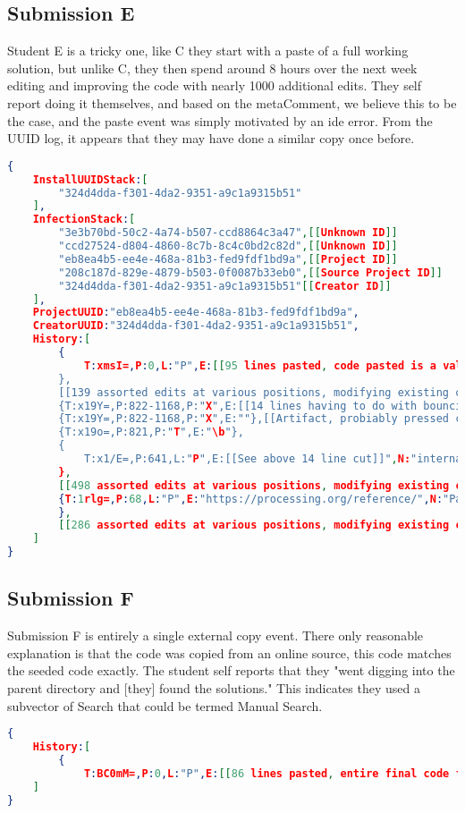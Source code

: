 \documentclass[12pt,final,thesis,actual]{uhthesis}
\newcommand{\metaComment}{metaComment\xspace}
\begin{document}
\subsection{Submission E}
Student E is a tricky one, like C they start with a paste of a full working solution, but unlike C, they then spend around 8 hours over the next week editing and improving the code with nearly 1000 additional edits.  They self report doing it themselves, and based on the \metaComment, we believe this to be the case, and the paste event was simply motivated by an ide error.  From the UUID log, it appears that they may have done a similar copy once before.\pagebreak
\begin{lstlisting}[language=json]
{
	InstallUUIDStack:[
		"324d4dda-f301-4da2-9351-a9c1a9315b51"
	],
	InfectionStack:[
		"3e3b70bd-50c2-4a74-b507-ccd8864c3a47",[[Unknown ID]]
		"ccd27524-d804-4860-8c7b-8c4c0bd2c82d",[[Unknown ID]]
		"eb8ea4b5-ee4e-468a-81b3-fed9fdf1bd9a",[[Project ID]]
		"208c187d-829e-4879-b503-0f0087b33eb0",[[Source Project ID]]
		"324d4dda-f301-4da2-9351-a9c1a9315b51"[[Creator ID]]
	],
	ProjectUUID:"eb8ea4b5-ee4e-468a-81b3-fed9fdf1bd9a",
	CreatorUUID:"324d4dda-f301-4da2-9351-a9c1a9315b51",
	History:[
		{
			T:xmsI=,P:0,L:"P",E:[[95 lines pasted, code pasted is a valid solution, but not the final]]}",N:"paste from project with same creator;Paste from project with UUID 208c187d-829e-4879-b503-0f0087b33eb0;"
		},
		[[139 assorted edits at various positions, modifying existing code, and adding new code/comments, no copies or pastes]]
		{T:x19Y=,P:822-1168,P:"X",E:[[14 lines having to do with bouncing]]},
		{T:x19Y=,P:822-1168,P:"X",E:""},[[Artifact, probiably pressed ctrl X twice]]
		{T:x19o=,P:821,P:"T",E:"\b"},
		{
			T:x1/E=,P:641,L:"P",E:[[See above 14 line cut]]",N:"internal paste;"
		},
		[[498 assorted edits at various positions, modifying existing code, and adding new code/comments including many short interal copy paste]]
		{T:1rlg=,P:68,L:"P",E:"https://processing.org/reference/",N:"Paste from noncoded source"[[copied URL from browser in comment]]
		},
		[[286 assorted edits at various positions, modifying existing code, and adding new code/comments including many short interal copy paste]]
	]
}
\end{lstlisting}
\subsection{Submission F}
Submission F is entirely a single external copy event.  There only reasonable explanation is that the code was copied from an online source, this code matches the seeded code exactly.  The student self reports that they "went digging into the parent directory and [they] found the solutions."  This indicates they used a subvector of Search that could be termed Manual Search.
\begin{lstlisting}[language=json]
{
	History:[
		{
			T:BC0mM=,P:0,L:"P",E:[[86 lines pasted, entire final code file]],N:"Paste from noncoded source"}
	]
}
\end{lstlisting}
\end{document}
